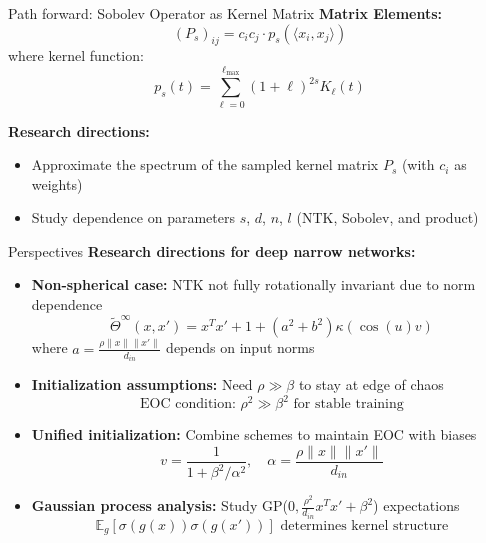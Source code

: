 \documentclass{beamer}
\newcommand{\E}{\mathbb{E}}
\begin{document}
\begin{frame}{Path forward: Sobolev Operator as Kernel Matrix}
\textbf{Matrix Elements:}
\[ (P_s)_{ij} = c_i c_j \cdot p_s(\langle x_i, x_j \rangle) \]
where kernel function:
\[ p_s(t) = \sum_{\ell=0}^{\ell_{\max}} (1+\ell)^{2s} K_\ell(t) \]

\textbf{ Research directions:}
\begin{itemize}
\item Approximate the spectrum of the sampled kernel matrix $P_s$ (with $c_i$ as weights)
\item Study dependence on parameters $s$, $d$, $n$, $l$ (NTK, Sobolev, and product)
\end{itemize}
\end{frame}


\begin{frame}{Perspectives}
\textbf{Research directions for deep narrow networks:}
\begin{itemize}
\item \textbf{Non-spherical case:} NTK not fully rotationally invariant due to norm dependence
\[ \tilde{\Theta}^\infty(x, x') = x^T x' + 1 + (a^2 + b^2)\kappa(\cos(u)v) \]
where $a = \frac{\rho\|x\|\|x'\|}{d_{in}}$ depends on input norms

\item \textbf{Initialization assumptions:} Need $\rho \gg \beta$ to stay at edge of chaos
\[ \text{EOC condition: } \rho^2 \gg \beta^2 \text{ for stable training} \]

\item \textbf{Unified initialization:} Combine schemes to maintain EOC with biases
\[ v = \frac{1}{1 + \beta^2/\alpha^2}, \quad \alpha = \frac{\rho\|x\|\|x'\|}{d_{in}} \]

\item \textbf{Gaussian process analysis:} Study GP($0, \frac{\rho^2}{d_{in}}x^T x' + \beta^2$) expectations
\[ \E_g[\sigma(g(x))\sigma(g(x'))] \text{ determines kernel structure} \]
\end{itemize}
\end{frame}
\end{document}
